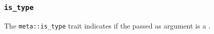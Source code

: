 
\subsubsection{\texttt{is\_type}}

The \texttt{meta::is\_type}
trait indicates if the  passed as argument is a .


